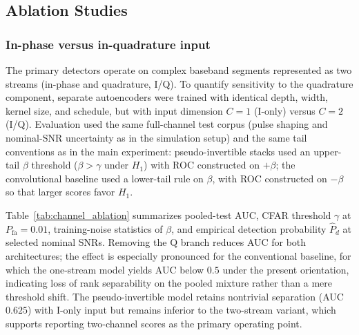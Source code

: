 
\subsection{Ablation Studies}

\subsubsection{In-phase versus in-quadrature input}
The primary detectors operate on complex baseband segments represented as two streams (in-phase and quadrature, I/Q). To quantify sensitivity to the quadrature component, separate autoencoders were trained with identical depth, width, kernel size, and schedule, but with input dimension $C\!=\!1$ (I-only) versus $C\!=\!2$ (I/Q). Evaluation used the same full-channel test corpus (pulse shaping and nominal-SNR uncertainty as in the simulation setup) and the same tail conventions as in the main experiment: pseudo-invertible stacks used an upper-tail $\beta$ threshold ($\beta>\gamma$ under $H_1$) with ROC constructed on $+\beta$; the convolutional baseline used a lower-tail rule on $\beta$, with ROC constructed on $-\beta$ so that larger scores favor $H_1$.

Table~\ref{tab:channel_ablation} summarizes pooled-test AUC, CFAR threshold $\gamma$ at $P_{\mathrm{fa}}\!=\!0.01$, training-noise statistics of $\beta$, and empirical detection probability $\hat{P}_d$ at selected nominal SNRs. Removing the Q branch reduces AUC for both architectures; the effect is especially pronounced for the conventional baseline, for which the one-stream model yields AUC below $0.5$ under the present orientation, indicating loss of rank separability on the pooled mixture rather than a mere threshold shift. The pseudo-invertible model retains nontrivial separation (AUC $0.625$) with I-only input but remains inferior to the two-stream variant, which supports reporting two-channel scores as the primary operating point.

